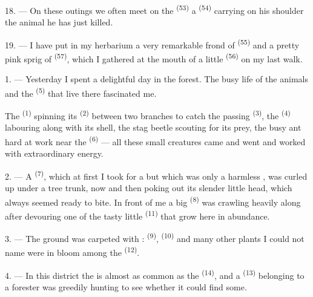 18. --- On these outings we often meet on the  \textsuperscript{(53)} a
 \textsuperscript{(54)} carrying on his shoulder the animal he
has just killed.

19. --- I have put in my herbarium a very remarkable frond of 
\textsuperscript{(55)} and a pretty pink sprig of  \textsuperscript{(57)},
which I gathered at the mouth of a little  \textsuperscript{(56)} on my last
walk.

\VUsaut{3.0mm}
\VUsaut{3.0mm}

\VUsaut{3.0mm}

1. --- Yesterday I spent a delightful day in the forest. The busy life of the animals and the
 \textsuperscript{(5)} that live there fascinated me.

The  \textsuperscript{(1)} spinning its  \textsuperscript{(2)}
between two branches to catch the passing  \textsuperscript{(3)}, the
 \textsuperscript{(4)} labouring along with its shell, the stag beetle
scouting for its prey, the busy ant hard at work near the 
\textsuperscript{(6)} --- all these small creatures came and went and worked with
extraordinary energy.

2. --- A  \textsuperscript{(7)}, which at first I took for a
 but which was only a harmless , was
curled up under a tree trunk, now and then poking out its slender little head, which always
seemed ready to bite. In front of me a big  \textsuperscript{(8)} was crawling
heavily along after devouring one of the tasty little 
\textsuperscript{(11)} that grow here in abundance.

3. --- The ground was carpeted with :
 \textsuperscript{(9)},  \textsuperscript{(10)} and
many other plants I could not name were in bloom among the
 \textsuperscript{(12)}.

4. --- In this district the  is almost as common as the
 \textsuperscript{(14)}, and a  \textsuperscript{(13)}
belonging to a forester was greedily hunting to see whether it could find some.

